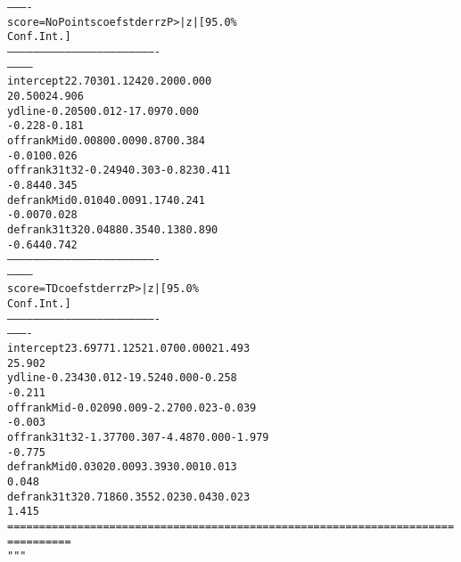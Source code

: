 \documentclass[letterpaper,10pt,english]{/anaconda/lib/python2.7/site-packages/sphinx/texinputs/sphinxhowto}
\newenvironment{InvisibleVerbatim}
        {\begin{mdframed}[leftmargin=0.1\linewidth,innerleftmargin=3pt,innerrightmargin=3pt, userdefinedwidth=1\linewidth, linewidth=0pt, linecolor=white, usetwoside=false]}
        {\end{mdframed}}
\begin{document}
\begin{InvisibleVerbatim}
\begin{alltt}
----------
score=NoPoints       coef    std err          z      P>|z|      [95.0\%
Conf. Int.]
----------------------------------------------------------------------
------------
intercept         22.7030      1.124     20.200      0.000
20.500    24.906
ydline            -0.2050      0.012    -17.097      0.000
-0.228    -0.181
offrankMid         0.0080      0.009      0.870      0.384
-0.010     0.026
offrank31t32      -0.2494      0.303     -0.823      0.411
-0.844     0.345
defrankMid         0.0104      0.009      1.174      0.241
-0.007     0.028
defrank31t32       0.0488      0.354      0.138      0.890
-0.644     0.742
----------------------------------------------------------------------
------------
    score=TD       coef    std err          z      P>|z|      [95.0\%
Conf. Int.]
----------------------------------------------------------------------
----------
intercept       23.6977      1.125     21.070      0.000        21.493
25.902
ydline          -0.2343      0.012    -19.524      0.000        -0.258
-0.211
offrankMid      -0.0209      0.009     -2.270      0.023        -0.039
-0.003
offrank31t32    -1.3770      0.307     -4.487      0.000        -1.979
-0.775
defrankMid       0.0302      0.009      3.393      0.001         0.013
0.048
defrank31t32     0.7186      0.355      2.023      0.043         0.023
1.415
======================================================================
==========
"""\end{alltt}

            \end{InvisibleVerbatim}
            
        
    



    

        
        

            
\end{document}
